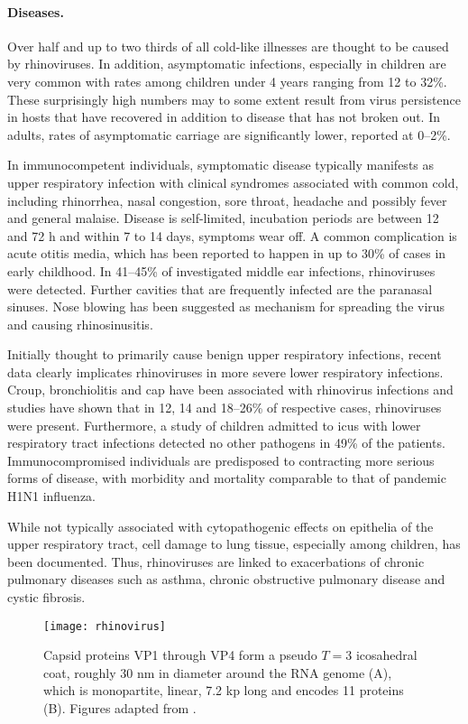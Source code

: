 \paragraph{Diseases.}
Over half and up to two thirds of all cold-like illnesses are thought to be caused by rhinoviruses. In addition, asymptomatic infections, especially in children are very common with rates among children under 4 years ranging from 12 to 32\%. These surprisingly high numbers may to some extent result from virus persistence in hosts that have recovered in addition to disease that has not broken out. In adults, rates of asymptomatic carriage are significantly lower, reported at 0--2\%.

In immunocompetent individuals, symptomatic disease typically manifests as upper respiratory infection with clinical syndromes associated with common cold, including rhinorrhea, nasal congestion, sore throat, headache and possibly fever and general malaise. Disease is self-limited, incubation periods are between 12 and 72 h and within 7 to 14 days, symptoms wear off. A common complication is acute otitis media, which has been reported to happen in up to 30\% of cases in early childhood. In 41--45\% of investigated middle ear infections, rhinoviruses were detected. Further cavities that are frequently infected are the paranasal sinuses. Nose blowing has been suggested as mechanism for spreading the virus and causing rhinosinusitis.

Initially thought to primarily cause benign upper respiratory infections,  recent data clearly implicates rhinoviruses in more severe lower respiratory infections. Croup, bronchiolitis and \gls{cap} have been associated with rhinovirus infections and studies have shown that in 12, 14 and 18--26\% of respective cases, rhinoviruses were present. Furthermore, a study of children admitted to \glspl{icu} with lower respiratory tract infections detected no other pathogens in 49\% of the patients. Immunocompromised individuals are predisposed to contracting more serious forms of disease, with morbidity and mortality comparable to that of pandemic H1N1 influenza.

While not typically associated with cytopathogenic effects on epithelia of the upper respiratory tract, cell damage to lung tissue, especially among children, has been documented. Thus, rhinoviruses are linked to exacerbations of chronic pulmonary diseases such as asthma, chronic obstructive pulmonary disease and cystic fibrosis.

\begin{figure}
  \centering
  \texttt{[image: rhinovirus]}
  \caption[Capsid structure and genome of rhinoviruses.]{Capsid proteins VP1 through VP4 form a pseudo $T=3$ icosahedral coat, roughly 30 nm in diameter around the RNA genome (A), which is monopartite, linear, 7.2 kp long and encodes 11 proteins (B). Figures adapted from \cite{Hulo2011}.}
  \label{fig:rhinovirus}
\end{figure}

